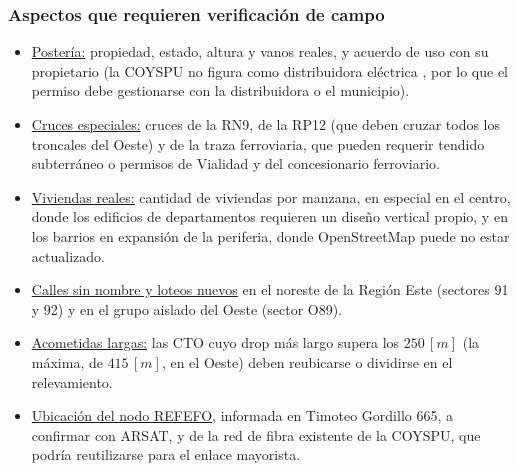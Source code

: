 \subsubsection{Aspectos que requieren verificación de campo}
\label{sec:verificacion}
\begin{itemize}
    \item \underline{Postería:} propiedad, estado, altura y vanos reales, y acuerdo de uso con su propietario (la COYSPU no figura como distribuidora eléctrica \cite{coyspu}, por lo que el permiso debe gestionarse con la distribuidora o el municipio).
    \item \underline{Cruces especiales:} cruces de la RN9, de la RP12 (que deben cruzar todos los troncales del Oeste) y de la traza ferroviaria, que pueden requerir tendido subterráneo o permisos de Vialidad y del concesionario ferroviario.
    \item \underline{Viviendas reales:} cantidad de viviendas por manzana, en especial en el centro, donde los edificios de departamentos requieren un diseño vertical propio, y en los barrios en expansión de la periferia, donde OpenStreetMap puede no estar actualizado.
    \item \underline{Calles sin nombre y loteos nuevos} en el noreste de la Región Este (sectores 91 y 92) y en el grupo aislado del Oeste (sector O89).
    \item \underline{Acometidas largas:} las CTO cuyo drop más largo supera los $250 \, [m]$ (la máxima, de $415 \, [m]$, en el Oeste) deben reubicarse o dividirse en el relevamiento.
    \item \underline{Ubicación del nodo REFEFO}, informada en Timoteo Gordillo 665, a confirmar con ARSAT, y de la red de fibra existente de la COYSPU, que podría reutilizarse para el enlace mayorista.
\end{itemize}

